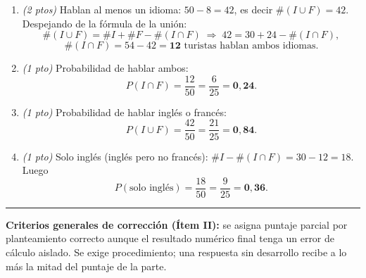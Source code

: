 \documentclass[12pt, a4paper]{article}
\begin{document}
\begin{enumerate}[label=\alph*), leftmargin=*, itemsep=6pt]
    \item \textit{(2 ptos)} Hablan al menos un idioma: $50 - 8 = 42$, es decir $\#(I \cup F) = 42$. Despejando de la fórmula de la unión:
    \[ \#(I \cup F) = \#I + \#F - \#(I \cap F) \;\Rightarrow\; 42 = 30 + 24 - \#(I \cap F), \]
    \[ \#(I \cap F) = 54 - 42 = \mathbf{12} \text{ turistas hablan ambos idiomas.} \]

    \item \textit{(1 pto)} Probabilidad de hablar ambos:
    \[ P(I \cap F) = \frac{12}{50} = \frac{6}{25} = \mathbf{0{,}24}. \]

    \item \textit{(1 pto)} Probabilidad de hablar inglés o francés:
    \[ P(I \cup F) = \frac{42}{50} = \frac{21}{25} = \mathbf{0{,}84}. \]

    \item \textit{(1 pto)} Solo inglés (inglés pero no francés): $\#I - \#(I \cap F) = 30 - 12 = 18$. Luego
    \[ P(\text{solo inglés}) = \frac{18}{50} = \frac{9}{25} = \mathbf{0{,}36}. \]
\end{enumerate}

\vspace{0.5cm}
\noindent\rule{\textwidth}{0.4pt}
\vspace{0.1cm}

\noindent\textbf{Criterios generales de corrección (Ítem II):} se asigna puntaje parcial por planteamiento correcto aunque el resultado numérico final tenga un error de cálculo aislado. Se exige procedimiento; una respuesta sin desarrollo recibe a lo más la mitad del puntaje de la parte.
\end{document}
